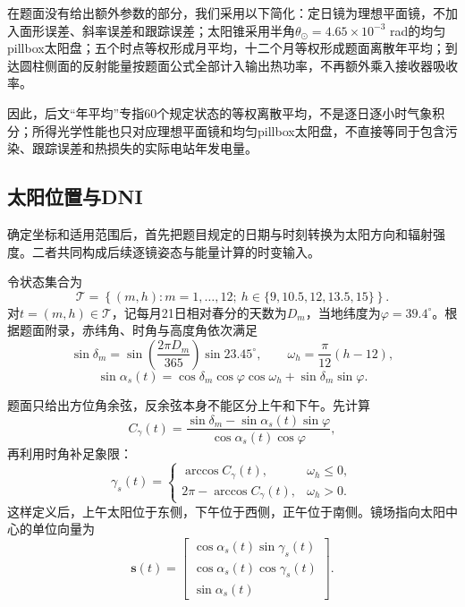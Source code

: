 在题面没有给出额外参数的部分，我们采用以下简化：定日镜为理想平面镜，不加入面形误差、斜率误差和跟踪误差；太阳锥采用半角$\theta_\odot=4.65\times10^{-3}$ rad的均匀pillbox太阳盘；五个时点等权形成月平均，十二个月等权形成题面离散年平均；到达圆柱侧面的反射能量按题面公式全部计入输出热功率，不再额外乘入接收器吸收率。

因此，后文“年平均”专指60个规定状态的等权离散平均，不是逐日逐小时气象积分；所得光学性能也只对应理想平面镜和均匀pillbox太阳盘，不直接等同于包含污染、跟踪误差和热损失的实际电站年发电量。

\subsection{太阳位置与DNI}

确定坐标和适用范围后，首先把题目规定的日期与时刻转换为太阳方向和辐射强度。二者共同构成后续逐镜姿态与能量计算的时变输入。

令状态集合为
\begin{equation}
\mathcal{T}=\left\{(m,h):m=1,\ldots,12;\ h\in\{9,10.5,12,13.5,15\}\right\}.
\end{equation}
对$t=(m,h)\in\mathcal{T}$，记每月21日相对春分的天数为$D_m$，当地纬度为$\varphi=39.4^\circ$。根据题面附录，赤纬角、时角与高度角依次满足
\begin{equation}
\sin\delta_m=\sin\left(\frac{2\pi D_m}{365}\right)\sin 23.45^\circ,
\qquad \omega_h=\frac{\pi}{12}(h-12),
\end{equation}
\begin{equation}
\sin\alpha_s(t)=\cos\delta_m\cos\varphi\cos\omega_h+
\sin\delta_m\sin\varphi.
\end{equation}

题面只给出方位角余弦，反余弦本身不能区分上午和下午。先计算
\begin{equation}
C_\gamma(t)=\frac{\sin\delta_m-\sin\alpha_s(t)\sin\varphi}
{\cos\alpha_s(t)\cos\varphi},
\end{equation}
再利用时角补足象限：
\begin{equation}
\gamma_s(t)=
\begin{cases}
\arccos C_\gamma(t), & \omega_h\le 0,\\
2\pi-\arccos C_\gamma(t), & \omega_h>0.
\end{cases}
\end{equation}
这样定义后，上午太阳位于东侧，下午位于西侧，正午位于南侧。镜场指向太阳中心的单位向量为
\begin{equation}
\boldsymbol{s}(t)=
\begin{bmatrix}
\cos\alpha_s(t)\sin\gamma_s(t)\\
\cos\alpha_s(t)\cos\gamma_s(t)\\
\sin\alpha_s(t)
\end{bmatrix}.
\end{equation}

